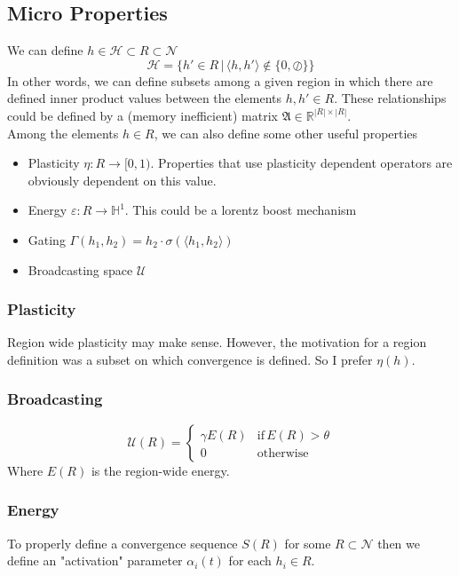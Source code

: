 \documentclass{article}
\begin{document}
\subsection{Micro Properties}
We can define $h \in \mathcal{H} \subset R \subset \mathcal{N}$
\begin{equation}
    \mathcal{H} = \{ h' \in R \, | \, \langle h,h' \rangle\notin \{0,\oslash \} \}
\end{equation}
In other words, we can define subsets among a given region in which there are defined inner product values between the elements $h, h' \in R$. These relationships could be defined by a (memory inefficient) matrix $\mathfrak{A} \in \mathbb{R}^{|R| \times |R|}$. \\

Among the elements $h \in R$, we can also define some other useful properties
\begin{itemize}
    \item Plasticity $\eta: R \to [0,1)$. Properties that use plasticity dependent operators are obviously dependent on this value.
    \item Energy $\varepsilon : R \to \mathbb{H}^1$. This could be a lorentz boost mechanism
    \item Gating $\Gamma(h_1, h_2) = h_2 \cdot \sigma(\langle h_1, h_2 \rangle)$
    \item Broadcasting space $\mathcal{U}$
\end{itemize}

\subsubsection{Plasticity}
Region wide plasticity may make sense. However, the motivation for a region definition was a subset on which convergence is defined. So I prefer $\eta(h)$.

\subsubsection{Broadcasting}
\begin{equation}
    \mathcal{U}(R) = \begin{cases}
        \gamma E(R) & \text{if} \, E(R) > \theta \\
        0 & \text{otherwise}
    \end{cases}
\end{equation}
Where $E(R)$ is the region-wide energy.

\subsubsection{Energy}
To properly define a convergence sequence $S(R)$ for some $R \subset \mathcal{N}$ then we define an "activation" parameter $\alpha_i(t)$ for each $h_i \in R$.
\end{document}
